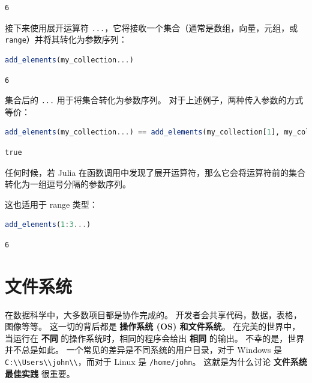 \documentclass[
  notoc %
]{tufte-book}
\newcommand{\passthrough}[1]{#1}
\begin{document}
\begin{lstlisting}[language=Output]
6
\end{lstlisting}

接下来使用展开运算符
\passthrough{\lstinline!...!}，它将接收一个集合（通常是数组，向量，元组，或
\passthrough{\lstinline!range!}）并将其转化为参数序列：

\begin{lstlisting}[language=Julia]
add_elements(my_collection...)
\end{lstlisting}

\begin{lstlisting}[language=Output]
6
\end{lstlisting}

集合后的 \passthrough{\lstinline!...!} 用于将集合转化为参数序列。
对于上述例子，两种传入参数的方式等价：

\begin{lstlisting}[language=Julia]
add_elements(my_collection...) == add_elements(my_collection[1], my_collection[2], my_collection[3])
\end{lstlisting}

\begin{lstlisting}[language=Output]
true
\end{lstlisting}

任何时候，若 Julia
在函数调用中发现了展开运算符，那么它会将运算符前的集合转化为一组逗号分隔的参数序列。

这也适用于 range 类型：

\begin{lstlisting}[language=Julia]
add_elements(1:3...)
\end{lstlisting}

\begin{lstlisting}[language=Output]
6
\end{lstlisting}

\hypertarget{sec:filesystem}{%
\section{文件系统}\label{sec:filesystem}}

在数据科学中，大多数项目都是协作完成的。
开发者会共享代码，数据，表格，图像等等。 这一切的背后都是
\textbf{操作系统 (OS) 和文件系统}。 在完美的世界中，当运行在
\textbf{不同} 的操作系统时，相同的程序会给出 \textbf{相同} 的输出。
不幸的是，世界并不总是如此。 一个常见的差异是不同系统的用户目录，对于
Windows 是 \passthrough{\lstinline!C:\\Users\\john\\!}，而对于 Linux 是
\passthrough{\lstinline!/home/john!}。 这就是为什么讨论
\textbf{文件系统最佳实践} 很重要。
\end{document}
